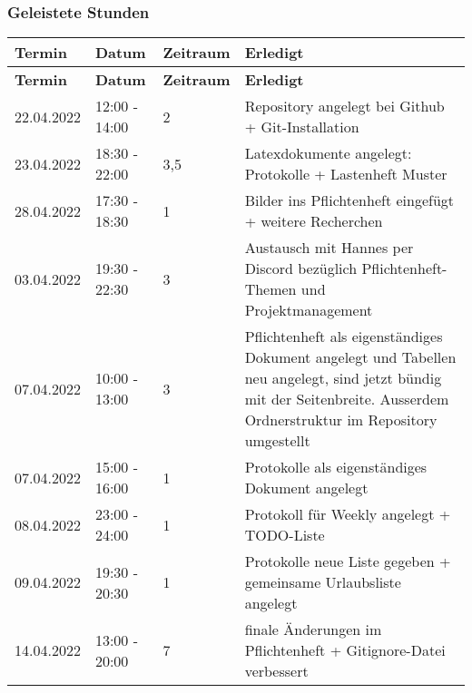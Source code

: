 \subsubsection{Geleistete Stunden}
\begin{flushleft}
		\begin{longtable}{p{2cm}p{}p{2cm}p{}}
            \toprule
            \textbf{Termin} & \textbf{Datum} & \textbf{Zeitraum} & \textbf{Erledigt}\\
            \midrule\endfirsthead
            \toprule
            \textbf{Termin} & \textbf{Datum} & \textbf{Zeitraum} & \textbf{Erledigt}\\
            \midrule\endhead
            	22.04.2022 & 12:00 - 14:00 & 2 & Repository angelegt bei Github +  Git-Installation\\ \midrule
    			23.04.2022 & 18:30 - 22:00 & 3,5 & Latexdokumente angelegt: Protokolle + Lastenheft Muster \\ \midrule
			    28.04.2022 & 17:30 - 18:30 & 1 & Bilder ins Pflichtenheft eingefügt + weitere Recherchen\\ \midrule
				03.04.2022 & 19:30 - 22:30 & 3 & Austausch mit Hannes per Discord bezüglich Pflichtenheft-Themen und Projektmanagement\\ \midrule
				07.04.2022 & 10:00 - 13:00 & 3 & Pflichtenheft als eigenständiges Dokument angelegt und Tabellen neu angelegt, sind jetzt bündig mit der Seitenbreite. Ausserdem Ordnerstruktur im Repository umgestellt\\ \midrule
				07.04.2022 & 15:00 - 16:00 & 1 & Protokolle als eigenständiges Dokument angelegt \\ \midrule
				08.04.2022 & 23:00 - 24:00 & 1 & Protokoll für Weekly angelegt + TODO-Liste \\ \midrule
				09.04.2022 & 19:30 - 20:30 & 1 & Protokolle neue Liste gegeben + gemeinsame Urlaubsliste angelegt \\ \midrule
				14.04.2022 & 13:00 - 20:00 & 7 & finale Änderungen im Pflichtenheft + Gitignore-Datei verbessert \\ 
            \bottomrule
    \end{longtable}
\end{flushleft}